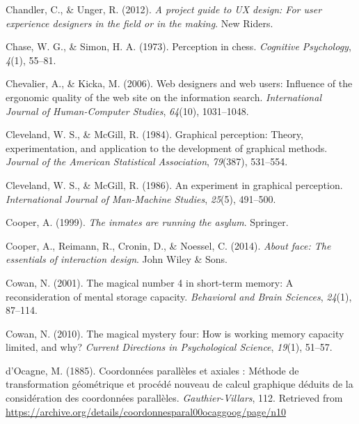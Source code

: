 \documentclass[print]{nuthesis}
\newlength{\cslhangindent}
\newenvironment{CSLReferences}[2]%
{\setlength{\parindent}{0pt}%
\everypar{\setlength{\hangindent}{\cslhangindent}}\ignorespaces}%
{\par}
\begin{document}
\begin{CSLReferences}{1}{0}
\leavevmode{}%
Chandler, C., \& Unger, R. (2012). \emph{A project guide to UX design: For user experience designers in the field or in the making}. New Riders.

\leavevmode{}%
Chase, W. G., \& Simon, H. A. (1973). Perception in chess. \emph{Cognitive Psychology}, \emph{4}(1), 55--81.

\leavevmode{}%
Chevalier, A., \& Kicka, M. (2006). Web designers and web users: Influence of the ergonomic quality of the web site on the information search. \emph{International Journal of Human-Computer Studies}, \emph{64}(10), 1031--1048.

\leavevmode{}%
Cleveland, W. S., \& McGill, R. (1984). Graphical perception: Theory, experimentation, and application to the development of graphical methods. \emph{Journal of the American Statistical Association}, \emph{79}(387), 531--554.

\leavevmode{}%
Cleveland, W. S., \& McGill, R. (1986). An experiment in graphical perception. \emph{International Journal of Man-Machine Studies}, \emph{25}(5), 491--500.

\leavevmode{}%
Cooper, A. (1999). \emph{The inmates are running the asylum}. Springer.

\leavevmode{}%
Cooper, A., Reimann, R., Cronin, D., \& Noessel, C. (2014). \emph{About face: The essentials of interaction design}. John Wiley \& Sons.

\leavevmode{}%
Cowan, N. (2001). The magical number 4 in short-term memory: A reconsideration of mental storage capacity. \emph{Behavioral and Brain Sciences}, \emph{24}(1), 87--114.

\leavevmode{}%
Cowan, N. (2010). The magical mystery four: How is working memory capacity limited, and why? \emph{Current Directions in Psychological Science}, \emph{19}(1), 51--57.

\leavevmode{}%
d'Ocagne, M. (1885). {Coordonnées parallèles et axiales : Méthode de transformation géométrique et procédé nouveau de calcul graphique déduits de la considération des coordonnées parallèles}. \emph{Gauthier-Villars}, 112. Retrieved from \url{https://archive.org/details/coordonnesparal00ocaggoog/page/n10}


\end{CSLReferences}
\end{document}

